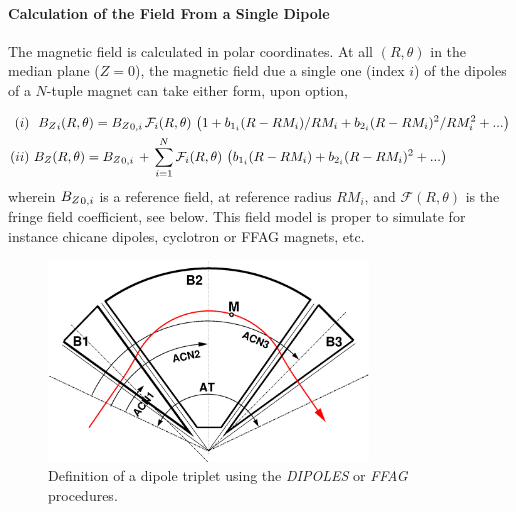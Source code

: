 {\bigskip

\paragraph{Calculation of the Field From a Single Dipole} 

 \noindent The magnetic field is calculated in  polar
coordinates.  At all $(R,\theta)$ in the median plane ($Z=0$), the 
magnetic field  due  a single one (index $i$) of the  dipoles  of a $N$-tuple   magnet can 
take either form, upon option, 

\begin{eqnarray}
(i) & ~ ~ {B_Z}_i(R,\theta) =  {B_Z}_{0,i} \, \mathcal{F}_i(R,\theta) \, 
\left( 1 +  b_{1_i} (R-RM_{i})/RM_{i} + b_{2_i} (R-RM_{i})^2/RM_{i}^2 +... \right)  \label{EqFieldDipolesi} \\
 (ii) & ~   B_Z(R,\theta) =  {B_Z}_{0,i} \, + \, \sum_{i=1}^N  \mathcal{F}_i(R,\theta) \, 
\left( b_{1_i} (R-RM_{i}) + b_{2_i} (R-RM_{i})^2 +... \right)
\label{EqFieldDipolesii}
\end{eqnarray}
%
\noindent wherein ${B_Z}_{0,i}$  is a reference field, at reference radius  $RM_{i}$, 
 and $ \mathcal{F}(R,\theta)$ is the fringe field coefficient, see below. 
This field model is proper to simulate for instance chicane dipoles,  cyclotron 
 or FFAG   magnets, etc. 


\begin{figure}[h]
 \begin{center}
\includegraphics[width=8.5cm]{ffagTriplet.eps}  
 \caption{ \label{figDFD}
Definition of a dipole triplet using  the \textsl{DIPOLES} or  \textsl{FFAG}  procedures. 
}
  \end{center}
\end{figure}





}
